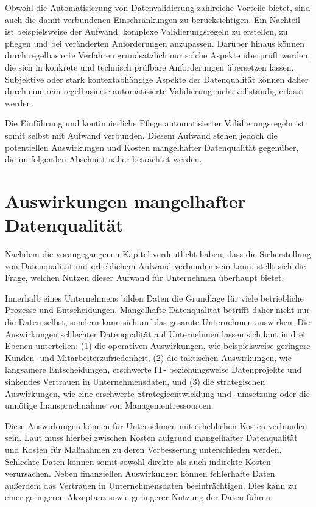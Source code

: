 \documentclass[../main.tex]{subfiles}
\begin{document}
Obwohl die Automatisierung von Datenvalidierung zahlreiche Vorteile bietet, sind auch die damit verbundenen Einschränkungen zu berücksichtigen. Ein Nachteil ist beispielsweise der Aufwand, komplexe Validierungsregeln zu erstellen, zu pflegen und bei veränderten Anforderungen anzupassen. Darüber hinaus können durch regelbasierte Verfahren grundsätzlich nur solche Aspekte überprüft werden, die sich in konkrete und technisch prüfbare Anforderungen übersetzen lassen. Subjektive oder stark kontextabhängige Aspekte der Datenqualität können daher durch eine rein regelbasierte automatisierte Validierung nicht vollständig erfasst werden. 

Die Einführung und kontinuierliche Pflege automatisierter Validierungsregeln ist somit selbst mit Aufwand verbunden. Diesem Aufwand stehen jedoch die potentiellen Auswirkungen und Kosten mangelhafter Datenqualität gegenüber, die im folgenden Abschnitt näher betrachtet werden.

\section{Auswirkungen mangelhafter Datenqualität}

Nachdem die vorangegangenen Kapitel verdeutlicht haben, dass die Sicherstellung von Datenqualität mit erheblichem Aufwand verbunden sein kann, stellt sich die Frage, welchen Nutzen dieser Aufwand für Unternehmen überhaupt bietet.

Innerhalb eines Unternehmens bilden Daten die Grundlage für viele betriebliche Prozesse und Entscheidungen. Mangelhafte Datenqualität betrifft daher nicht nur die Daten selbst, sondern kann sich auf das gesamte Unternehmen auswirken. Die Auswirkungen schlechter Datenqualität auf Unternehmen lassen sich laut \textcite{redmanImpactPoorData1998} in drei Ebenen unterteilen: (1) die operativen Auswirkungen, wie beispielsweise geringere Kunden- und Mitarbeiterzufriedenheit, (2) die taktischen Auswirkungen, wie langsamere Entscheidungen, erschwerte IT- beziehungsweise Datenprojekte und sinkendes Vertrauen in Unternehmensdaten, und (3) die strategischen Auswirkungen, wie eine erschwerte Strategieentwicklung und -umsetzung oder die unnötige Inanspruchnahme von Managementressourcen. 

Diese Auswirkungen können für Unternehmen mit erheblichen Kosten verbunden sein. Laut \textcite{haugCostsPoorData2011} muss hierbei zwischen Kosten aufgrund mangelhafter Datenqualität und Kosten für Maßnahmen zu deren Verbesserung unterschieden werden. Schlechte Daten können somit sowohl direkte als auch indirekte Kosten verursachen. Neben finanziellen Auswirkungen können fehlerhafte Daten außerdem das Vertrauen in Unternehmensdaten beeinträchtigen. Dies kann zu einer geringeren Akzeptanz sowie geringerer Nutzung der Daten führen.
\end{document}
